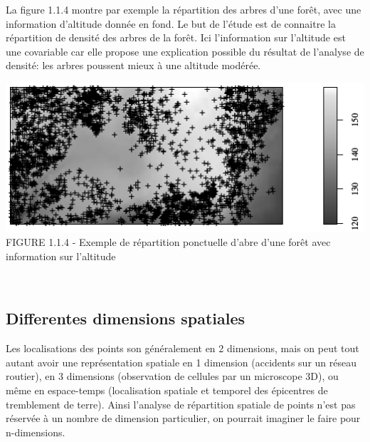 \documentclass[french,12pt,a4paper]{report}
\begin{document}
\begin{minipage}{0.45\linewidth}
La figure 1.1.4 montre par exemple la répartition des arbres d'une forêt, avec une information d'altitude donnée en fond. Le but de l'étude est de connaitre la répartition de densité des arbres de la forêt. Ici l'information sur l'altitude est une covariable car elle propose une explication possible du résultat de l'analyse de densité: les arbres poussent mieux à une altitude modérée.
\end{minipage}\hfill
\begin{minipage}{0.45\linewidth}
\includegraphics[scale=0.5]{images/covariables.png}\\
\small{FIGURE 1.1.4 - Exemple de répartition ponctuelle d'abre d'une forêt avec information sur l'altitude}
\end{minipage}
\\

\subsection{Differentes dimensions spatiales}
Les localisations des points son généralement en 2 dimensions, mais on peut tout autant avoir une représentation spatiale en 1 dimension (accidents sur un réseau routier), en 3 dimensions (observation de cellules par un microscope 3D), ou même en espace-temps (localisation spatiale et temporel des épicentres de tremblement de terre). Ainsi l'analyse de répartition spatiale de points n'est pas réservée à un nombre de dimension particulier, on pourrait imaginer le faire pour n-dimensions.\\


\end{document}
